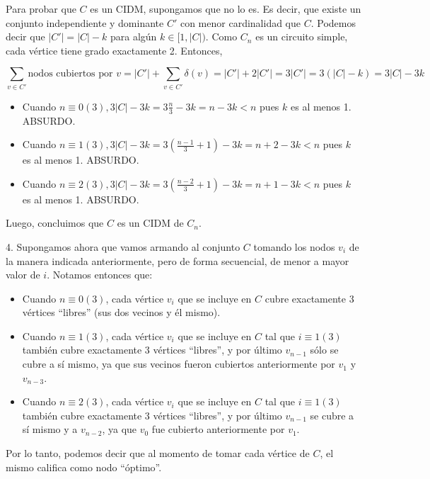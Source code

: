 Para probar que $C$ es un CIDM, supongamos que no lo es.  Es decir, que existe un conjunto independiente y dominante $C'$ con menor cardinalidad que $C$.  Podemos decir que $|C'| = |C| - k$ para algún $k \in [1, |C|)$. Como $C_n$ es un circuito simple, cada vértice tiene grado exactamente 2.  Entonces,

\begin{equation*}
\sum_{v \in C'} \text{nodos cubiertos por }v = |C'| + \sum_{v \in C'} \delta(v) = |C'| + 2|C'| = 3 |C'| = 3(|C| - k) = 3|C| - 3k
\end{equation*}

\begin{itemize}
	\item Cuando $n \equiv 0 (3), 3|C| - 3k = 3\frac{n}{3} - 3k = n-3k < n$ pues $k$ es al menos 1. ABSURDO.
	\item Cuando $n \equiv 1 (3), 3|C| - 3k = 3(\frac{n-1}{3} + 1) - 3k = n+2-3k < n$ pues $k$ es al menos 1. ABSURDO.
	\item Cuando $n \equiv 2 (3), 3|C| - 3k = 3(\frac{n-2}{3} + 1) - 3k = n+1-3k < n$ pues $k$ es al menos 1. ABSURDO.
\end{itemize}

Luego, concluimos que $C$ es un CIDM de $C_n$.

4. Supongamos ahora que vamos armando al conjunto $C$ tomando los nodos $v_i$ de la manera indicada anteriormente, pero de forma secuencial, de menor a mayor valor de $i$. Notamos entonces que:

\begin{itemize}
	\item Cuando $n \equiv 0 (3)$, cada vértice $v_i$ que se incluye en $C$ cubre exactamente 3 vértices ``libres'' (sus dos vecinos y él mismo).
	\item Cuando $n \equiv 1 (3)$, cada vértice $v_i$ que se incluye en $C$ tal que $i \equiv 1 (3)$ también cubre exactamente 3 vértices ``libres'', y por último $v_{n-1}$ sólo se cubre a sí mismo, ya que sus vecinos fueron cubiertos anteriormente por $v_1$ y $v_{n-3}$.
	\item Cuando $n \equiv 2 (3)$, cada vértice $v_i$ que se incluye en $C$ tal que $i \equiv 1 (3)$ también cubre exactamente 3 vértices ``libres'', y por último $v_{n-1}$ se cubre a sí mismo y a $v_{n-2}$, ya que $v_0$ fue cubierto anteriormente por $v_1$.
\end{itemize}

Por lo tanto, podemos decir que al momento de tomar cada vértice de $C$, el mismo califica como nodo ``óptimo''.

